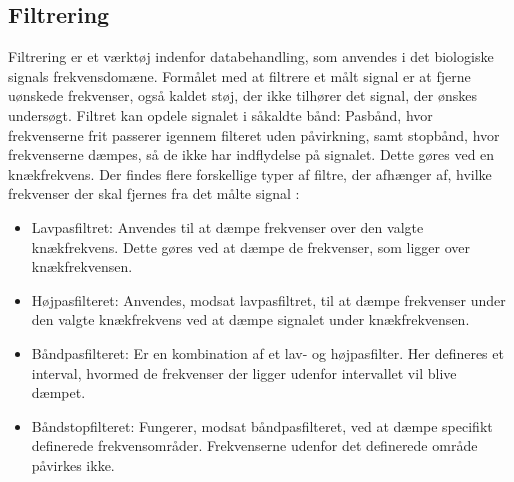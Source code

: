 \subsection{Filtrering}\label{Filterafsnit}
Filtrering er et værktøj indenfor databehandling, som anvendes i det biologiske signals frekvensdomæne. Formålet med at filtrere et målt signal er at fjerne uønskede frekvenser, også kaldet støj, der ikke tilhører det signal, der ønskes undersøgt. Filtret kan opdele signalet i såkaldte bånd: Pasbånd, hvor frekvenserne frit passerer igennem filteret uden påvirkning, samt stopbånd, hvor frekvenserne dæmpes, så de ikke har indflydelse på signalet. Dette gøres ved en knækfrekvens.
Der findes flere forskellige typer af filtre, der afhænger af, hvilke frekvenser der skal fjernes fra det målte signal \cite{Devasahayam2000}:

\begin{itemize}
	\item Lavpasfiltret: Anvendes til at dæmpe frekvenser over den valgte knækfrekvens. Dette gøres ved at dæmpe de frekvenser, som ligger over knækfrekvensen.
	\item Højpasfilteret: Anvendes, modsat lavpasfiltret, til at dæmpe frekvenser under den valgte knækfrekvens ved at dæmpe signalet under knækfrekvensen.
	\item Båndpasfilteret: Er en kombination af et lav- og højpasfilter.  Her defineres et interval, hvormed de frekvenser der ligger udenfor intervallet vil blive dæmpet.
	\item Båndstopfilteret: Fungerer, modsat båndpasfilteret, ved at dæmpe specifikt definerede frekvensområder. Frekvenserne udenfor det definerede område påvirkes ikke. 
\end{itemize}
  
